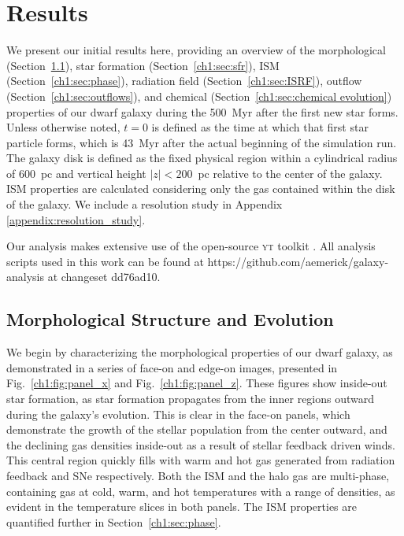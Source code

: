 \section{Results}
\label{ch1:sec:results}
We present our initial results here, providing an overview of the morphological (Section~\ref{ch1:sec:structure}), star formation (Section~\ref{ch1:sec:sfr}), ISM (Section~\ref{ch1:sec:phase}), radiation field (Section~\ref{ch1:sec:ISRF}), outflow (Section~\ref{ch1:sec:outflows}), and chemical (Section~\ref{ch1:sec:chemical evolution}) properties of our dwarf galaxy during the 500~Myr after the first new star forms. Unless otherwise noted, $t = 0$ is defined as the time at which that first star particle forms, which is 43~Myr after the actual beginning of the simulation run. The galaxy disk is defined as the fixed physical region within a cylindrical radius of 600~pc and vertical height $|z| < 200$~pc relative to the center of the galaxy. ISM properties are calculated considering only the gas contained within the disk of the galaxy. We include a resolution study in Appendix \ref{appendix:resolution_study}.

Our analysis makes extensive use of the open-source \textsc{yt} toolkit \citep{yt}. All analysis scripts used in this work can be found at https://github.com/aemerick/galaxy-analysis at changeset dd76ad10.

\subsection{Morphological Structure and Evolution}
\label{ch1:sec:structure}

We begin by characterizing the morphological properties of our dwarf galaxy, as demonstrated in a series of face-on and edge-on images, presented in Fig.~\ref{ch1:fig:panel_x} and Fig.~\ref{ch1:fig:panel_z}. These figures show inside-out star formation, as star formation propagates from the inner regions outward during the galaxy's evolution. This is clear in the face-on panels, which demonstrate the growth of the stellar population from the center outward, and the declining gas densities inside-out as a result of stellar feedback driven winds. This central region quickly fills with warm and hot gas generated from radiation feedback and SNe respectively. Both the ISM and the halo gas are multi-phase, containing gas at cold, warm, and hot temperatures with a range of densities, as evident in the temperature slices in both panels. The ISM properties are quantified further in Section~\ref{ch1:sec:phase}.

